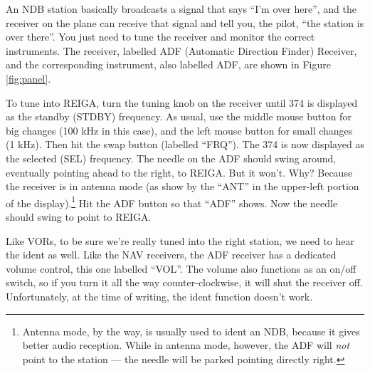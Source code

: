 An NDB station basically broadcasts a signal that says ``I'm over
here'', and the receiver on the plane can receive that signal and tell
you, the pilot, ``the station is over there''.  You just need to tune
the receiver and monitor the correct instruments.  The receiver,
labelled ADF (Automatic Direction Finder) Receiver, and the
corresponding instrument, also labelled ADF, are shown in Figure
\ref{fig:panel}.

To tune into REIGA, turn the tuning knob on the receiver until 374 is
displayed as the standby (STDBY) frequency.  As usual, use the middle mouse button for
big changes (100 kHz in this case), and the left mouse button for
small changes (1 kHz).  Then hit the swap button (labelled ``FRQ'').
The 374 is now displayed as the selected (SEL) frequency.  The needle
on the ADF should swing around, eventually pointing ahead to the
right, to REIGA.  But it won't.  Why?  Because the receiver is in
antenna mode (as show by the ``ANT'' in the upper-left portion of the
display).\footnote{Antenna mode, by the way, is usually used to ident
  an NDB, because it gives better audio reception.  While in antenna
  mode, however, the ADF will \emph{not} point to the station --- the
  needle will be parked pointing directly right.}  Hit the ADF button
so that ``ADF'' shows.  Now the needle should swing to point to REIGA.


Like VORs, to be sure we're really tuned into the right station, we
need to hear the ident as well.  Like the NAV receivers, the ADF
receiver has a dedicated volume control, this one labelled ``VOL''.
The volume also functions as an on/off switch, so if you turn it all
the way counter-clockwise, it will shut the receiver off.
Unfortunately, at the time of writing, the ident function doesn't
work.

